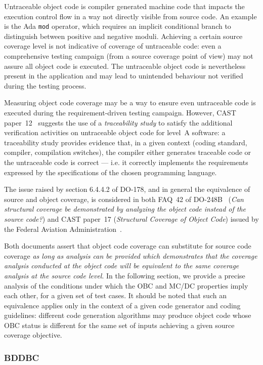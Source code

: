\documentclass[a4paper,12pt,twoside]{article}
\begin{document}
Untraceable object code is compiler generated machine code that impacts
the execution control flow in a way not directly visible from source code. An
example is the Ada \texttt{mod} operator, which requires an implicit
conditional branch to distinguish between positive and negative
moduli. Achieving a certain source coverage level is not indicative of
coverage of untraceable code: even a comprehensive testing campaign (from a
source coverage point of view) may not assure all object code is executed.
%
The untraceable object code is nevertheless present in the application
and may lead to unintended behaviour not verified during the testing process.

Measuring object code coverage may be a way to ensure even untraceable
code is executed during the requirement-driven testing campaign. However, CAST
paper~12~\cite{cast12} suggests the use of a \emph{traceability study} to
satisfy the additional verification activities on untraceable object code for
level~A software: a traceability study provides evidence that, in a given
context (coding standard, compiler, compilation switches), the compiler either
generates traceable code or the untraceable code is correct --- i.e. it
correctly implements the requirements expressed by the specifications of the
chosen programming language.

The issue raised by section 6.4.4.2 of DO-178, and in general the
equivalence of source and object coverage, is considered in both FAQ~42
of DO-248B~\cite{do248b} (\emph{Can structural coverage be demonstrated
by analyzing the object code instead of the source code?}) and CAST
paper~17 (\emph{Structural Coverage of Object Code}) issued by the
Federal Aviation Administration~\cite{cast17}.

Both documents assert that object code coverage can substitute for
source code coverage \emph{as long as analysis can be provided which
demonstrates that the coverage analysis conducted at the object code
will be equivalent to the same coverage analysis at the source code
level}. In the following section, we provide a precise analysis of
the conditions under which the OBC and MC/DC properties imply each
other, for a given set of test cases. It should be noted that such an
equivalence applies only in the context of a given code generator and
coding guidelines: different code generation algorithms may produce
object code whose OBC status is different for the same set of inputs
achieving a given source coverage objective.


\subsubsection{BDDBC}
\end{document}
